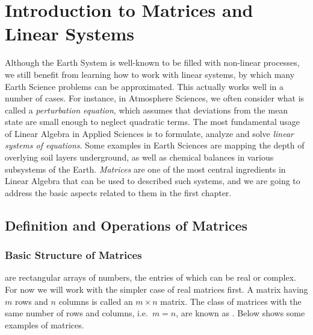 \chapter{Introduction to Matrices and Linear Systems}

Although the Earth System is well-known to be filled with non-linear processes, we still benefit from learning how to work with linear systems, by which many Earth Science problems can be approximated. This actually works well in a number of cases. For instance, in Atmosphere Sciences, we often consider what is called a \textit{perturbation equation}, which assumes that deviations from the mean state are small enough to neglect quadratic terms. The most fundamental usage of Linear Algebra in Applied Sciences is to formulate, analyze and solve \textit{linear systems of equations}. Some examples in Earth Sciences are mapping the depth of overlying soil layers underground, as well as chemical balances in various subsystems of the Earth. \textit{Matrices} are one of the most central ingredients in Linear Algebra that can be used to described such systems, and we are going to address the basic aspects related to them in the first chapter.

\section{Definition and Operations of Matrices}
\label{section:matrixdefn}

\subsection{Basic Structure of Matrices}
 are rectangular arrays of numbers, the entries of which can be real or complex. For now we will work with the simpler case of real matrices first. A matrix having $m$ rows and $n$ columns is called an $m \times n$ matrix. The class of matrices with the same number of rows and columns, i.e.\ $m = n$, are known as . Below shows some examples of matrices.

